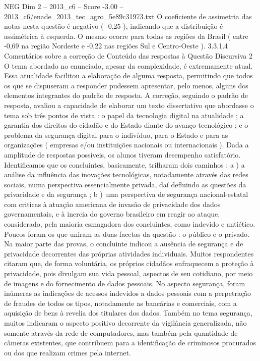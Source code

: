 \begin{textsample}{NEG Dim 2 – 2013\_c6 – Score -3.00 – 2013\_c6/enade\_2013\_tec\_agro\_5e89c31973.txt}
O coeficiente de assimetria das notas nesta questão é negativo ( -0,25 ), indicando que a distribuição é assimétrica à esquerda.
O mesmo ocorre para todas as regiões da Brasil ( entre -0,69 na região Nordeste e -0,22 nas regiões Sul e Centro-Oeste ). 3.3.1.4 Comentários sobre a correção de Conteúdo das respostas à Questão Discursiva 2 O tema abordado no enunciado, apesar da complexidade, é extremamente atual.
Essa atualidade facilitou a elaboração de alguma resposta, permitindo que todos os que se dispuseram a responder pudessem apresentar, pelo menos, alguns dos elementos integrantes do padrão de resposta.
A correção, seguindo o padrão de resposta, avaliou a capacidade de elaborar um texto dissertativo que abordasse o tema sob três pontos de vista : o papel da tecnologia digital na atualidade ; a garantia dos direitos do cidadão e do Estado diante do avanço tecnológico ; e o problema da segurança digital para o indivíduo, para o Estado e para as organizações ( empresas e/ou instituições nacionais ou internacionais ).
Dada a amplitude de respostas possíveis, os alunos tiveram desempenho satisfatório.
Identificamos que os concluintes, basicamente, trilharam dois caminhos : a ) a análise da influência das inovações tecnológicas, notadamente através das redes sociais, numa perspectiva essencialmente privada, daí defluindo as questões da privacidade e da segurança ; b ) uma perspectiva de segurança nacional-estatal com criticas à atuação americana de invasão de privacidade dos dados governamentais, e à inercia do governo brasileiro em reagir ao ataque, considerado, pela maioria esmagadora dos concluintes, como indevido e antiético.
Poucos foram os que uniram as duas facetas da questão : o público e o privado.
Na maior parte das provas, o concluinte indicou a ausência de segurança e de privacidade decorrentes das próprias atividades individuais.
Muitos respondentes citaram que, de forma voluntária, os próprios cidadãos enfraquecem a proteção à privacidade, pois divulgam sua vida pessoal, aspectos de seu cotidiano, por meio de imagens e do fornecimento de dados pessoais.
No aspecto segurança, foram inúmeras as indicações de acessos indevidos a dados pessoais com a perpetração de fraudes de todos os tipos, notadamente as bancárias e comerciais, com a aquisição de bens à revelia dos titulares dos dados.
Também no tema segurança, muitos indicaram o aspecto positivo decorrente da vigilância generalizada, não somente através da rede de computadores, mas também pela quantidade de câmeras existentes, que contribuem para a identificação de criminosos procurados ou dos que realizam crimes pela internet.

\end{textsample}
